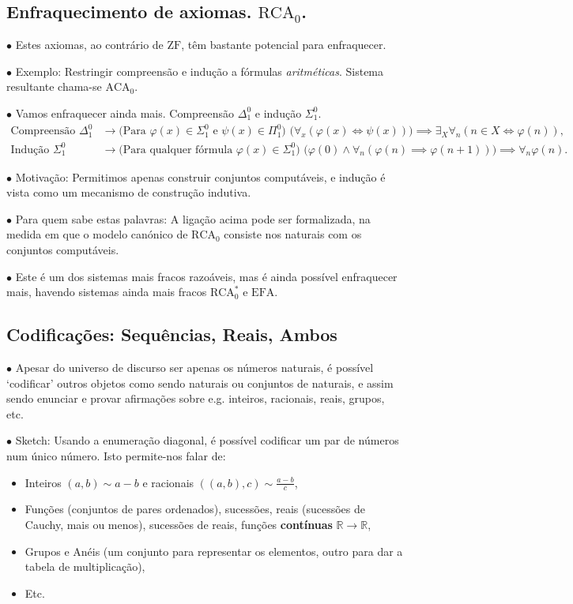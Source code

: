 \documentclass{article}
\theoremstyle{nonumberplain}
\newcommand{\R}{\mathbb{R}}
\newcommand{\EFA}{\mathrm{EFA}}
\newcommand{\RCA}{\mathrm{RCA}}
\newcommand{\ACA}{\mathrm{ACA}}
\newcommand{\ZF}{\mathrm{ZF}}
\newcommand\point[1]{\noindent \hspace{\labelsep} $\bullet$ #1 \smallskip}
\begin{document}
\subsection{Enfraquecimento de axiomas. $\RCA_0$.}

\point{Estes axiomas, ao contrário de $\ZF$, têm bastante potencial para enfraquecer.}

\point{Exemplo: Restringir compreensão e indução a fórmulas \emph{aritméticas}. Sistema resultante chama-se $\ACA_0$.}

\point{Vamos enfraquecer ainda mais. Compreensão $\Delta^0_1$ e indução $\Sigma^0_1$.}
\begin{equation}
\begin{aligned}
\text{Compreensão $\Delta^0_1$} &\rightarrow \text{(Para $\varphi(x) \in \Sigma^0_1$ e $\psi(x) \in \Pi^0_1$) } \big(\forall_x (\varphi(x) \Leftrightarrow \psi(x)) \big) \implies \exists_X \forall_n (n \in X \iff \varphi(n)),\\
\text{Indução $\Sigma^0_1$ } &\rightarrow \text{(Para qualquer fórmula $\varphi(x) \in \Sigma^0_1$) } \big(\varphi(0) \land \forall_n (\varphi(n) \implies \varphi(n+1)) \big) \implies \forall_n \varphi(n).
\end{aligned}
\end{equation}

\point{Motivação: Permitimos apenas construir conjuntos computáveis, e indução é vista como um mecanismo de construção indutiva.}

\point{Para quem sabe estas palavras: A ligação acima pode ser formalizada, na medida em que o modelo canónico de $\RCA_0$ consiste nos naturais com os conjuntos computáveis.}

\point{Este é um dos sistemas mais fracos razoáveis, mas é ainda possível enfraquecer mais, havendo sistemas ainda mais fracos $\RCA_0^*$ e $\EFA$.}

\subsection{Codificações: Sequências, Reais, Ambos}

\point{Apesar do universo de discurso ser apenas os números naturais, é possível `codificar' outros objetos como sendo naturais ou conjuntos de naturais, e assim sendo enunciar e provar afirmações sobre e.g. inteiros, racionais, reais, grupos, etc.}

\point{Sketch: Usando a enumeração diagonal, é possível codificar um par de números num único número. Isto permite-nos falar de:

\begin{itemize}
\item Inteiros $(a,b) \sim a-b$ e racionais $((a,b),c) \sim \frac{a-b}c$,
\item Funções (conjuntos de pares ordenados), sucessões, reais (sucessões de Cauchy, mais ou menos), sucessões de reais, funções \textbf{contínuas} $\R \to \R$,
\item Grupos e Anéis (um conjunto para representar os elementos, outro para dar a tabela de multiplicação),
\item Etc.
\end{itemize}
}
\end{document}
